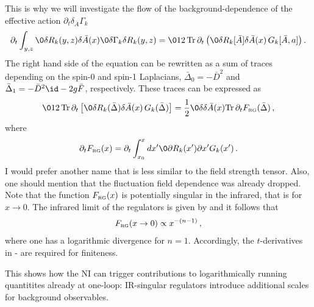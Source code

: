 \documentclass[11pt]{book} %
\newcommand{\Tr}{\mathrm{Tr}}
\begin{document}
{This is why we will investigate the flow of the background-dependence
of the effective action $\partial_t \delta_{\bar A} \Gamma_k$
\begin{align}
\label{eq:A-Rk}
	\partial_t \int_{y,z} \0{\delta R_k(y,z)}{\delta \bar A(x)}
	\0{\delta \Gamma_k}{\delta R_k(y,z)} =
	\012 \, \Tr\, \partial_t
	\left(\0{\delta R_k[\bar A]}{\delta \bar A(x)}\, G_k[\bar A,
	a]\right).
\end{align}
The right hand side of the equation can be rewritten as a sum of
traces depending on the spin-0 and spin-1 Laplacians, $\bar \Delta_0=
-\bar D^2$ and $\bar \Delta_1 =-\bar D^2\id -2 g \bar F$, respectively.
These traces can be expressed as
\begin{align}
	\label{eq:A-Rk1}
	\012 \,  \Tr\, \partial_t \left[\0{\delta R_k(\bar \Delta)}{\delta \bar
	A(x)}\, G_k(\bar \Delta )\right] =
  \frac{1}{2}
	\0{\delta }{\delta \bar A(x)}
	\Tr\, \partial_t F_{\text{\tiny RG}}(\bar\Delta)\,,
\end{align}
where
\begin{align}\label{eq:FA}
	\partial_t  F_{\text{\tiny RG}}(x)= \partial_t \int_{x_0}^x d x' \0{\partial
	R_k(x')}{\partial x'} G_k(x')\,.
\end{align}
{\colpl I would prefer another name that is less similar to the field strength tensor.
Also, one should mention that the fluctuation field dependence was already dropped.}
Note that the function $F_{\text{\tiny RG}}(x)$ is potentially
singular in the infrared, that is for $x\rightarrow 0$.  The infrared limit of
the regulators is given by  and it follows that
\begin{align}\label{eq:IRF}
	F_{\text{\tiny RG}}(x\to 0)
	\propto x^{-(n-1)}\,,
\end{align}
where one has a logarithmic divergence for $n=1$. Accordingly, the
$t$-derivatives in - are required for
finiteness.

This shows how the NI  can trigger
contributions to logarithmically running quantitites already at
one-loop: IR-singular regulators introduce additional scales for
background observables.

}
\end{document}
